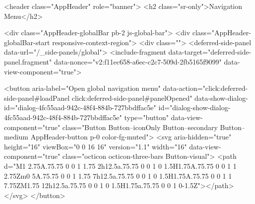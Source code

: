       

          

              <header class="AppHeader" role="banner">
  <h2 class="sr-only">Navigation Menu</h2>


    

    <div class="AppHeader-globalBar pb-2 js-global-bar">
      <div class="AppHeader-globalBar-start responsive-context-region">
        <div class="">
            <deferred-side-panel data-url="/_side-panels/global">
  <include-fragment data-target="deferred-side-panel.fragment" data-nonce="v2:f11ec658-a6ec-c2c7-509d-2fb5165f9099" data-view-component="true">
  
      <button aria-label="Open global navigation menu" data-action="click:deferred-side-panel#loadPanel click:deferred-side-panel#panelOpened" data-show-dialog-id="dialog-4fc55aad-942c-48f4-884b-727bbdffac5e" id="dialog-show-dialog-4fc55aad-942c-48f4-884b-727bbdffac5e" type="button" data-view-component="true" class="Button Button--iconOnly Button--secondary Button--medium AppHeader-button p-0 color-fg-muted">  <svg aria-hidden="true" height="16" viewBox="0 0 16 16" version="1.1" width="16" data-view-component="true" class="octicon octicon-three-bars Button-visual">
    <path d="M1 2.75A.75.75 0 0 1 1.75 2h12.5a.75.75 0 0 1 0 1.5H1.75A.75.75 0 0 1 1 2.75Zm0 5A.75.75 0 0 1 1.75 7h12.5a.75.75 0 0 1 0 1.5H1.75A.75.75 0 0 1 1 7.75ZM1.75 12h12.5a.75.75 0 0 1 0 1.5H1.75a.75.75 0 0 1 0-1.5Z"></path>
</svg>
</button>

